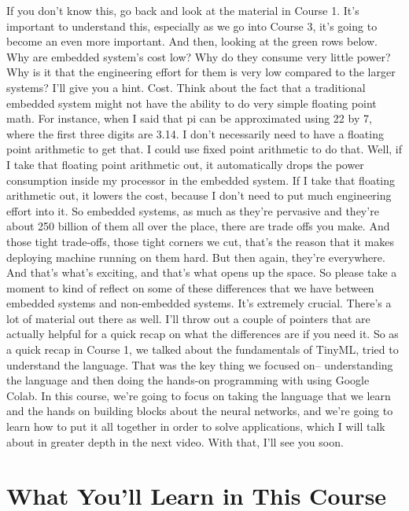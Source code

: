 If you don't know this, go back and look at the material in Course 1.
It's important to understand this, especially as we go into Course 3,
it's going to become an even more important.
And then, looking at the green rows below.
Why are embedded system's cost low?
Why do they consume very little power?
Why is it that the engineering effort for them
is very low compared to the larger systems?
I'll give you a hint.
Cost. Think about the fact that a traditional embedded system might not
have the ability to do very simple floating point math.
For instance, when I said that pi can be approximated using 22 by 7,
where the first three digits are 3.14.
I don't necessarily need to have a floating point arithmetic to get that.
I could use fixed point arithmetic to do that.
Well, if I take that floating point arithmetic out,
it automatically drops the power consumption
inside my processor in the embedded system.
If I take that floating arithmetic out, it
lowers the cost, because I don't need to put much engineering effort into it.
So embedded systems, as much as they're pervasive and they're about 250 billion
of them all over the place, there are trade offs you make.
And those tight trade-offs, those tight corners we cut,
that's the reason that it makes deploying machine running on them hard.
But then again, they're everywhere.
And that's what's exciting, and that's what opens up the space.
So please take a moment to kind of reflect on some of these differences
that we have between embedded systems and non-embedded systems.
It's extremely crucial.
There's a lot of material out there as well.
I'll throw out a couple of pointers that are actually
helpful for a quick recap on what the differences are if you need it.
So as a quick recap in Course 1, we talked
about the fundamentals of TinyML, tried to understand the language.
That was the key thing we focused on-- understanding the language
and then doing the hands-on programming with using Google Colab.
In this course, we're going to focus on taking the language that we learn
and the hands on building blocks about the neural networks,
and we're going to learn how to put it all together in order
to solve applications, which I will talk about in greater
depth in the next video.
With that, I'll see you soon.

\section{What You'll Learn in This Course}

